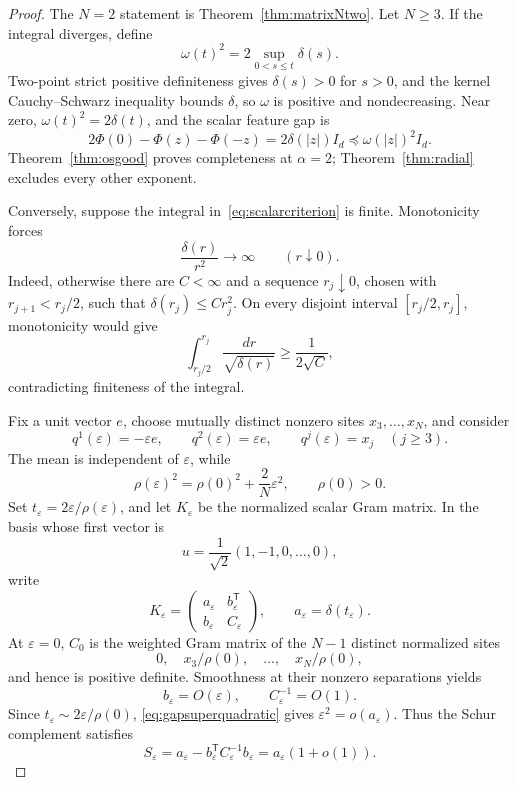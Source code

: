 \documentclass[11pt]{article}
\begin{document}
\begin{proof}
The \(N=2\) statement is Theorem~\ref{thm:matrixNtwo}.  Let \(N\ge3\).
If the integral diverges,
define
\[
 \omega(t)^2=2\sup_{0<s\le t}\delta(s).
\]
Two-point strict positive definiteness gives \(\delta(s)>0\) for \(s>0\),
and the kernel Cauchy--Schwarz inequality bounds \(\delta\), so \(\omega\)
is positive and nondecreasing.  Near zero,
\(\omega(t)^2=2\delta(t)\), and the scalar feature gap is
\[
 2\Phi(0)-\Phi(z)-\Phi(-z)=2\delta(|z|)I_d
 \preccurlyeq\omega(|z|)^2I_d.
\]
Theorem~\ref{thm:osgood} proves completeness at \(\alpha=2\);
Theorem~\ref{thm:radial} excludes every other exponent.

Conversely, suppose the integral in~\eqref{eq:scalarcriterion} is finite.
Monotonicity forces
\begin{equation}
 \frac{\delta(r)}{r^2}\longrightarrow\infty
 \qquad(r\downarrow0).
 \label{eq:gapsuperquadratic}
\end{equation}
Indeed, otherwise there are \(C<\infty\) and a sequence
\(r_j\downarrow0\), chosen with \(r_{j+1}<r_j/2\), such that
\(\delta(r_j)\le Cr_j^2\).  On every disjoint interval
\([r_j/2,r_j]\), monotonicity would give
\[
 \int_{r_j/2}^{r_j}\frac{dr}{\sqrt{\delta(r)}}
 \ge\frac1{2\sqrt C},
\]
contradicting finiteness of the integral.

Fix a unit vector \(e\), choose mutually distinct nonzero sites
\(x_3,\ldots,x_N\), and consider
\begin{equation}
 q^1(\varepsilon)=-\varepsilon e,\qquad
 q^2(\varepsilon)= \varepsilon e,\qquad
 q^j(\varepsilon)=x_j\quad(j\ge3).
 \label{eq:collisionpath}
\end{equation}
The mean is independent of \(\varepsilon\), while
\[
 \rho(\varepsilon)^2=\rho(0)^2+\frac{2}{N}\varepsilon^2,
 \qquad \rho(0)>0.
\]
Set \(t_\varepsilon=2\varepsilon/\rho(\varepsilon)\), and let
\(K_\varepsilon\) be the normalized scalar Gram matrix.  In the basis
whose first vector is
\[
 u=\frac{1}{\sqrt2}(1,-1,0,\ldots,0),
\]
write
\[
 K_\varepsilon=
 \begin{pmatrix}
  a_\varepsilon&b_\varepsilon^{\mathsf T}\\
  b_\varepsilon&C_\varepsilon
 \end{pmatrix},
 \qquad a_\varepsilon=\delta(t_\varepsilon).
\]
At \(\varepsilon=0\), \(C_0\) is the weighted Gram matrix of the
\(N-1\) distinct normalized sites
\[
 0,\quad x_3/\rho(0),\quad\ldots,\quad x_N/\rho(0),
\]
and hence is positive definite.
Smoothness at their nonzero separations yields
\[
 b_\varepsilon=O(\varepsilon),\qquad
 C_\varepsilon^{-1}=O(1).
\]
Since \(t_\varepsilon\sim2\varepsilon/\rho(0)\),
\eqref{eq:gapsuperquadratic} gives
\(\varepsilon^2=o(a_\varepsilon)\).  Thus the Schur complement satisfies
\begin{equation}
 S_\varepsilon
 =a_\varepsilon-
 b_\varepsilon^{\mathsf T}C_\varepsilon^{-1}b_\varepsilon
 =a_\varepsilon(1+o(1)).
 \label{eq:schurasymptotic}
\end{equation}


\end{proof}
\end{document}
